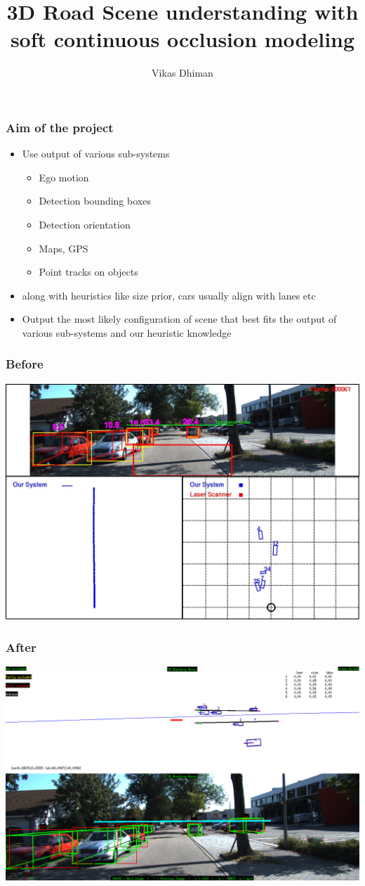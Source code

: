 \documentclass{beamer} %
\title{3D Road Scene understanding with soft continuous occlusion modeling}
\author{Vikas Dhiman}
\institute{NEC Laboratories America}
\begin{document}
\begin{frame} 
\titlepage
\end{frame}

\begin{frame}
  \frametitle{Aim of the project}
\begin{itemize}
  \item Use output of various sub-systems
    \begin{itemize}
      \item Ego motion
      \item Detection bounding boxes
      \item Detection orientation
      \item Maps, GPS
      \item Point tracks on objects
    \end{itemize}
    \pause
  \item along with heuristics like size prior, cars usually align with lanes
    etc
    \pause
  \item Output the most likely configuration of scene that best fits the
    output of various sub-systems and our heuristic knowledge
\end{itemize}
\end{frame}

\begin{frame}
  \frametitle{Before}
  \includegraphics[width=\textwidth]{graphics/Video000061.jpg}
\end{frame}

\begin{frame}
  \frametitle{After}
  \includegraphics[width=\textwidth]{graphics/61.png}
\end{frame}
\end{document}
